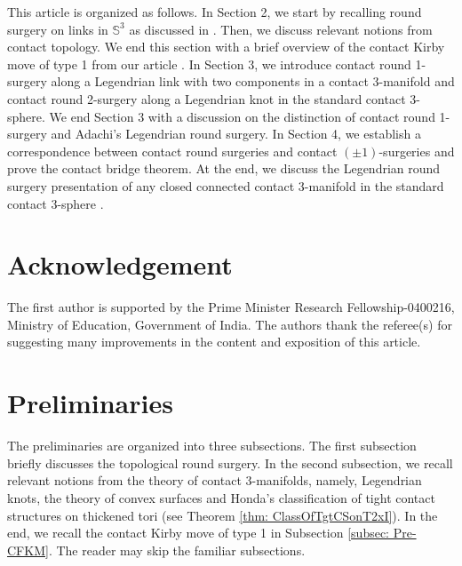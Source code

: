\documentclass{amsart}
\theoremstyle{plain}
\theoremstyle{remark}
\theoremstyle{definition}
\newcommand{\s}{\mathbb{S}}
\begin{document}

This article is organized as follows. 
In Section 2, we start by recalling round surgery on links in $\s^3$ as discussed in \cite{PD-RSD}. Then, we discuss relevant notions from contact topology. We end this section with a brief overview of the contact Kirby move of type 1 from our article \cite{PD-CFKM}. 
In Section 3, we introduce contact round 1-surgery along a Legendrian link with two components in a contact 3-manifold and contact round 2-surgery along a Legendrian knot in the standard contact 3-sphere. 
We end Section $3$ with a discussion on the distinction of contact round 1-surgery and Adachi's Legendrian round surgery. 
In Section 4, we establish a correspondence between contact round surgeries and contact $(\pm1)$-surgeries and prove the contact bridge theorem. At the end, we discuss the Legendrian round surgery presentation of any closed connected contact 3-manifold in the standard contact 3-sphere . 

    
    
\section*{Acknowledgement}
The first author is supported by the Prime Minister Research Fellowship-0400216, Ministry of Education, Government of India. The authors thank the referee(s) for suggesting many improvements in the content and exposition of this article. 

\section{Preliminaries}
The preliminaries are organized into three subsections. The first subsection briefly discusses the topological round surgery. In the second subsection, we 
recall relevant notions from the theory of contact 3-manifolds, namely, Legendrian knots, the theory of convex surfaces and Honda's classification of 
tight contact structures on thickened tori (see Theorem \ref{thm: ClassOfTgtCSonT2xI}). In the end, we recall the contact Kirby move of type 1 in Subsection \ref{subsec: Pre-CFKM}. The reader may skip the familiar subsections.
\end{document}
